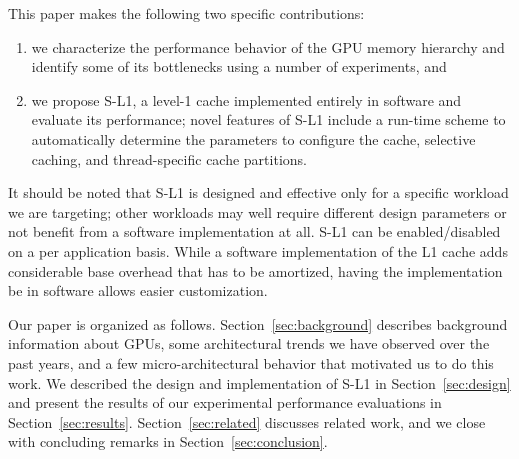This paper makes the following two specific contributions:
\begin{enumerate}
\item we characterize the performance behavior of the GPU memory hierarchy and identify some of its bottlenecks using a number of experiments, and
\item we propose S-L1, a level-1 cache implemented entirely in software and evaluate its performance; novel features of S-L1 include a run-time scheme to automatically determine the parameters to configure the cache, selective caching, and thread-specific cache partitions.
\end{enumerate}

It should be noted that S-L1 is designed and effective only for a specific workload we are targeting; other workloads may well require different design parameters or not benefit from a software implementation at all.
S-L1 can be enabled/disabled on a per application basis.
While a software implementation of the L1 cache adds considerable base overhead that has to be amortized, having the implementation be in software allows easier customization.

Our paper is organized as follows. 
Section~\ref{sec:background} describes background information about GPUs, some architectural trends we have observed over the past years, and a few micro-architectural behavior that motivated us to do this work. 
We described the design and implementation of S-L1 in Section~\ref{sec:design} and present the results of our experimental performance evaluations in Section~\ref{sec:results}.  
Section~\ref{sec:related} discusses related work, and we close with concluding remarks in 
Section~\ref{sec:conclusion}.




